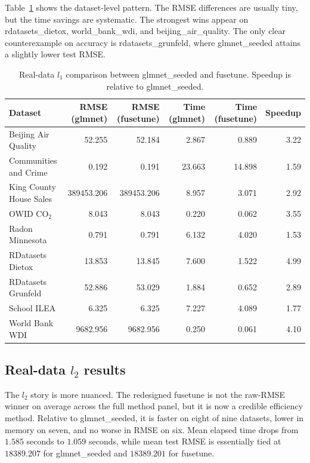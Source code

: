 \documentclass[pdflatex,iicol,sn-mathphys-num]{sn-jnl}
\newcommand{\codeid}{\texttt{fusetune}}
\def\texttt#1{#1}%
\def\codeid{fusetune}%
\def\ell{l}%
\begin{document}
Table~\ref{tab:real_l1} shows the dataset-level pattern. The RMSE differences are usually tiny, but the time savings are systematic. The strongest wins appear on \texttt{rdatasets\_dietox}, \texttt{world\_bank\_wdi}, and \texttt{beijing\_air\_quality}. The only clear counterexample on accuracy is \texttt{rdatasets\_grunfeld}, where \texttt{glmnet\_seeded} attains a slightly lower test RMSE.

\begin{table}[t]
\caption{Real-data \(\ell_1\) comparison between \texttt{glmnet\_seeded} and \codeid. Speedup is relative to \texttt{glmnet\_seeded}.}
\label{tab:real_l1}
\centering
\footnotesize
\begin{tabular}{lrrrrr}
\toprule
Dataset & RMSE (\texttt{glmnet}) & RMSE (\codeid) & Time (\texttt{glmnet}) & Time (\codeid) & Speedup \\
\midrule
Beijing Air Quality & 52.255 & 52.184 & 2.867 & 0.889 & 3.22 \\
Communities and Crime & 0.192 & 0.191 & 23.663 & 14.898 & 1.59 \\
King County House Sales & 389453.206 & 389453.206 & 8.957 & 3.071 & 2.92 \\
OWID CO\(_2\) & 8.043 & 8.043 & 0.220 & 0.062 & 3.55 \\
Radon Minnesota & 0.791 & 0.791 & 6.132 & 4.020 & 1.53 \\
RDatasets Dietox & 13.853 & 13.845 & 7.600 & 1.522 & 4.99 \\
RDatasets Grunfeld & 52.886 & 53.029 & 1.884 & 0.652 & 2.89 \\
School ILEA & 6.325 & 6.325 & 7.227 & 4.089 & 1.77 \\
World Bank WDI & 9682.956 & 9682.956 & 0.250 & 0.061 & 4.10 \\
\bottomrule
\end{tabular}
\end{table}

\subsection{Real-data \texorpdfstring{\(\ell_2\)}{L2} results}
The \(\ell_2\) story is more nuanced. The redesigned \codeid{} is not the raw-RMSE winner on average across the full method panel, but it is now a credible efficiency method. Relative to \texttt{glmnet\_seeded}, it is faster on eight of nine datasets, lower in memory on seven, and no worse in RMSE on six. Mean elapsed time drops from \(1.585\) seconds to \(1.059\) seconds, while mean test RMSE is essentially tied at \(18389.207\) for \texttt{glmnet\_seeded} and \(18389.201\) for \codeid.
\end{document}
